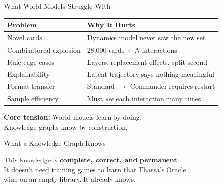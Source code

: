 \documentclass[aspectratio=169, 11pt]{beamer}
\begin{document}
\begin{frame}{What World Models Struggle With}
  \begin{center}
  \begin{tabular}{@{}lp{7cm}@{}}
    \toprule
    \textbf{Problem} & \textbf{Why It Hurts} \\
    \midrule
    Novel cards & Dynamics model never saw the new set \\
    Combinatorial explosion & 28,000 cards $\times$ $N$ interactions \\
    Rule edge cases & Layers, replacement effects, split-second \\
    Explainability & Latent trajectory says nothing meaningful \\
    Format transfer & Standard $\to$ Commander requires restart \\
    Sample efficiency & Must \textit{see} each interaction many times \\
    \bottomrule
  \end{tabular}
  \end{center}
  \vspace{0.5cm}
  \begin{center}
    \textbf{Core tension:} World models learn by doing.\\
    Knowledge graphs know by construction.
  \end{center}
\end{frame}

\begin{frame}{What a Knowledge Graph Knows}
  \begin{center}
  \end{center}
  \vspace{0.4cm}
  \begin{center}
    This knowledge is \textbf{complete, correct, and permanent}.\\[4pt]
    It doesn't need training games to learn that Thassa's Oracle\\
    wins on an empty library. It already knows.
  \end{center}
\end{frame}
\end{document}
